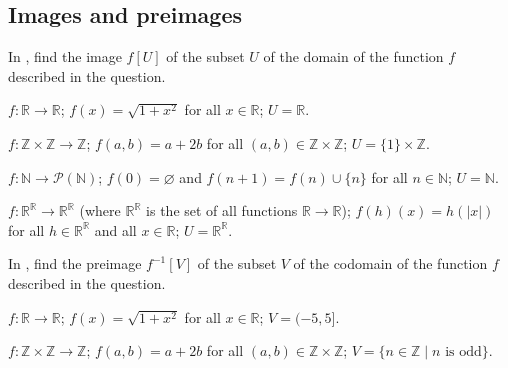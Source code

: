 \subsection*{Images and preimages}

In , find the image $f[U]$ of the subset $U$ of the domain of the function $f$ described in the question.

\begin{chapex}
\label{cqComputeImageBegin}
$f : \mathbb{R} \to \mathbb{R}$; $f(x) = \sqrt{1+x^2}$ for all $x \in \mathbb{R}$; $U = \mathbb{R}$.
\end{chapex}

\begin{chapex}
$f : \mathbb{Z} \times \mathbb{Z} \to \mathbb{Z}$; $f(a,b) = a+2b$ for all $(a,b) \in \mathbb{Z} \times \mathbb{Z}$; $U = \{ 1 \} \times \mathbb{Z}$.
\end{chapex}

\begin{chapex}
$f : \mathbb{N} \to \mathcal{P}(\mathbb{N})$; $f(0) = \varnothing$ and $f(n+1) = f(n) \cup \{ n \}$ for all $n \in \mathbb{N}$; $U = \mathbb{N}$.
\end{chapex}

\begin{chapex}
$f : \mathbb{R}^{\mathbb{R}} \to \mathbb{R}^{\mathbb{R}}$ (where $\mathbb{R}^{\mathbb{R}}$ is the set of all functions $\mathbb{R} \to \mathbb{R}$); $f(h)(x) = h(|x|)$ for all $h \in \mathbb{R}^{\mathbb{R}}$ and all $x \in \mathbb{R}$; $U = \mathbb{R}^{\mathbb{R}}$.
\end{chapex}

In , find the preimage $f^{-1}[V]$ of the subset $V$ of the codomain of the function $f$ described in the question.

\begin{chapex}
\label{cqComputePreimageBegin}
$f : \mathbb{R} \to \mathbb{R}$; $f(x) = \sqrt{1+x^2}$ for all $x \in \mathbb{R}$; $V = (-5,5]$.
\end{chapex}

\begin{chapex}
$f : \mathbb{Z} \times \mathbb{Z} \to \mathbb{Z}$; $f(a,b) = a+2b$ for all $(a,b) \in \mathbb{Z} \times \mathbb{Z}$; $V = \{ n \in \mathbb{Z} \mid n \text{ is odd} \}$.
\end{chapex}

